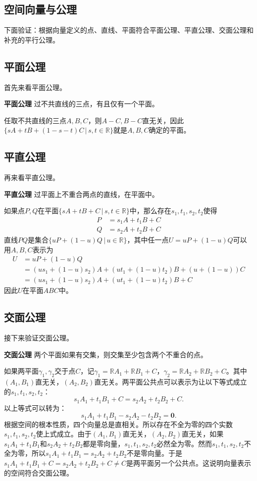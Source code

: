 \documentclass[12pt,UTF8,fontset=none]{ctexbook}
\begin{document}
\begin{appendix}
\chapter{空间向量与公理}

下面验证：根据向量定义的点、直线、平面符合平面公理、平直公理、交面公理和补充的平行公理。

\section{平面公理}
首先来看平面公理。
\begin{po}{\textbf{平面公理}}
    过不共直线的三点，有且仅有一个平面。
\end{po}
任取不共直线的三点$A,B,C$，则$A-C,B-C$直无关，因此$ \{sA+tB+(1 - s - t)C \, | \,s, t\in\mathbb{R}\}$就是$A,B,C$确定的平面。

\section{平直公理}
再来看平直公理。
\begin{po}{\textbf{平直公理}}
    过平面上不重合两点的直线，在平面中。
\end{po}
如果点$P,Q$在平面$ \{sA+tB+C \, | \, s,t\in\mathbb{R}\}$中，那么存在$s_1, t_1, s_2, t_2$使得
\begin{align*}
P &= s_1A + t_1B + C  \\
Q &= s_2A + t_2B + C  
\end{align*}
直线$PQ$是集合$\{uP+(1-u)Q \, | \, u\in \mathbb{R}\}$，其中任一点$U = uP+(1-u)Q$可以用$A,B,C$表示为
\begin{align*}
U &= uP+(1-u)Q  \\
&= (us_1 + (1-u)s_2)A + (ut_1 + (1-u)t_2)B + (u + (1-u))C   \\
&= (us_1 + (1-u)s_2)A + (ut_1 + (1-u)t_2)B + C 
\end{align*}
因此$U$在平面$ABC$中。

\section{交面公理}
接下来验证交面公理。
\begin{po}{\textbf{交面公理}}
    两个平面如果有交集，则交集至少包含两个不重合的点。
\end{po}
如果两平面$\gamma_1, \gamma_2$交于点$C$，记$\gamma_1 = \mathbb{R}A_1+\mathbb{R}B_1+C$，$\gamma_2 = \mathbb{R}A_2+\mathbb{R}B_2+C$。其中$(A_1,B_1)$直无关，$(A_2,B_2)$直无关。两平面公共点可以表示为让以下等式成立的$s_1,t_1,s_2,t_2$：
$$ s_1A_1+t_1B_1+C = s_2A_2+t_2B_2+C. $$
以上等式可以转为：
$$ s_1A_1+t_1B_1 - s_2A_2 - t_2B_2 = \mathbf{0}. $$
根据空间的根本性质，四个向量总是直相关。所以存在不全为零的四个实数$s_1,t_1,s_2,t_2$使上式成立。由于$(A_1,B_1)$直无关，$(A_2,B_2)$直无关，如果$s_1A_1+t_1B_1$和$s_2A_2 + t_2B_2$都是零向量，$s_1,t_1,s_2,t_2$必然全为零。然而$s_1,t_1,s_2,t_2$不全为零，所以$s_1A_1+t_1B_1 =s_2A_2 + t_2B_2$不是零向量。于是$s_1A_1+t_1B_1+C = s_2A_2+t_2B_2+C\neq C$是两平面另一个公共点。这说明向量表示的空间符合交面公理。


\end{appendix}
\end{document}
